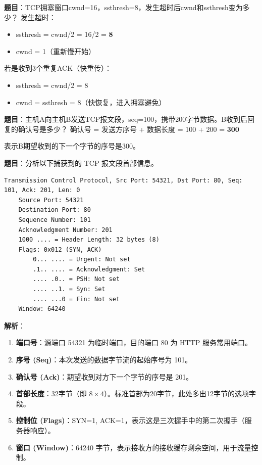 \begin{examplebox}[例题5.3 拥塞控制]
\textbf{题目}：TCP拥塞窗口cwnd=16，ssthresh=8，发生超时后cwnd和ssthresh变为多少？
\tcblower
发生超时：
\begin{itemize}[itemsep=0pt]
    \item ssthresh = cwnd/2 = 16/2 = \textbf{8}
    \item cwnd = 1（重新慢开始）
\end{itemize}

若是收到3个重复ACK（快重传）：
\begin{itemize}[itemsep=0pt]
    \item ssthresh = cwnd/2 = 8
    \item cwnd = ssthresh = 8（快恢复，进入拥塞避免）
\end{itemize}
\end{examplebox}

\begin{examplebox}[例题5.4 TCP综合计算]
\textbf{题目}：主机A向主机B发送TCP报文段，seq=100，携带200字节数据。B收到后回复的确认号是多少？
\tcblower
确认号 = 发送方序号 + 数据长度 = 100 + 200 = \textbf{300}

表示B期望收到的下一个字节的序号是300。
\end{examplebox}

\begin{examplebox}
\textbf{题目}：分析以下捕获到的 TCP 报文段首部信息。
\begin{lstlisting}[basicstyle=\ttfamily\footnotesize]
Transmission Control Protocol, Src Port: 54321, Dst Port: 80, Seq: 101, Ack: 201, Len: 0
    Source Port: 54321
    Destination Port: 80
    Sequence Number: 101
    Acknowledgment Number: 201
    1000 .... = Header Length: 32 bytes (8)
    Flags: 0x012 (SYN, ACK)
        0... .... = Urgent: Not set
        .1.. .... = Acknowledgment: Set
        .... .0.. = PSH: Not set
        .... ..1. = Syn: Set
        .... ...0 = Fin: Not set
    Window: 64240
\end{lstlisting}
\tcblower
\textbf{解析}：
\begin{enumerate}[itemsep=0pt]
    \item \textbf{端口号}：源端口 54321 为临时端口，目的端口 80 为 HTTP 服务常用端口。
    \item \textbf{序号 (Seq)}：本次发送的数据字节流的起始序号为 101。
    \item \textbf{确认号 (Ack)}：期望收到对方下一个字节的序号是 201。
    \item \textbf{首部长度}：32字节（即 $8 \times 4$）。标准首部为20字节，此处多出12字节的选项字段。
    \item \textbf{控制位 (Flags)}：SYN=1, ACK=1，表示这是三次握手中的第二次握手（服务器响应）。
    \item \textbf{窗口 (Window)}：64240 字节，表示接收方的接收缓存剩余空间，用于流量控制。
\end{enumerate}
\end{examplebox}

